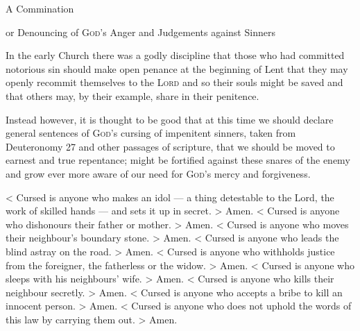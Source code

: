 \documentclass{liturgy}
\begin{document}
\begin{center}
  \huge
  A Commination

  \large
  or Denouncing of \textsc{God}'s Anger and Judgements against Sinners
\end{center}

\begin{leader}
  In the early Church there was a godly discipline that those who had committed notorious sin should make open penance at the beginning of Lent that they may openly recommit themselves to the \textsc{Lord} and so their souls might be saved and that others may, by their example, share in their penitence.

  Instead however, it is thought to be good that at this time we should declare general sentences of \textsc{God}'s cursing of impenitent sinners, taken from Deuteronomy 27 and other passages of scripture, that we should be moved to earnest and true repentance; might be fortified against these snares of the enemy and grow ever more aware of our need for \textsc{God}'s mercy and forgiveness.
\end{leader}

\vgap

\begin{responses}
  < Cursed is anyone who makes an idol --- a thing detestable to the Lord, the work of skilled hands --- and sets it up in secret.
  > Amen.
  < Cursed is anyone who dishonours their father or mother.
  > Amen.
  < Cursed is anyone who moves their neighbour's boundary stone.
  > Amen.
  < Cursed is anyone who leads the blind astray on the road.
  > Amen.
  < Cursed is anyone who withholds justice from the foreigner, the fatherless or the widow.
  > Amen.
  < Cursed is anyone who sleeps with his neighbours' wife.
  > Amen.
  < Cursed is anyone who kills their neighbour secretly.
  > Amen.
  < Cursed is anyone who accepts a bribe to kill an innocent person.
  > Amen.
  < Cursed is anyone who does not uphold the words of this law by carrying them out.
  > Amen.\end{responses}

\vgap
\end{document}
